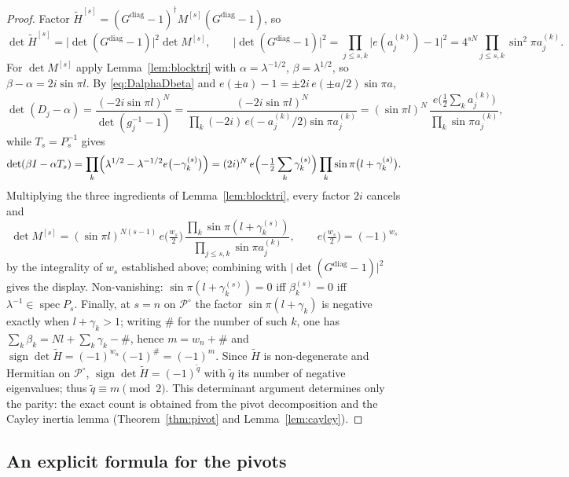 \documentclass[11pt]{article}
\theoremstyle{definition}
\newcommand{\Ht}{\widetilde H}
\begin{document}
\begin{proof}
Factor
$\Ht^{[s]}=(G^{\mathrm{diag}}-1)^{\dagger}M^{[s]}(G^{\mathrm{diag}}-1)$,
so
\[
\det\Ht^{[s]}=\bigl|\det(G^{\mathrm{diag}}-1)\bigr|^{2}\det M^{[s]},
\qquad
\bigl|\det(G^{\mathrm{diag}}-1)\bigr|^{2}
=\prod_{j\le s,k}\bigl|e(a_j^{(k)})-1\bigr|^{2}
=4^{sN}\prod_{j\le s,k}\sin^{2}\pi a_j^{(k)} .
\]
For $\det M^{[s]}$ apply Lemma~\ref{lem:blocktri} with
$\alpha=\lambda^{-1/2}$, $\beta=\lambda^{1/2}$, so
$\beta-\alpha=2i\sin\pi l$. By \eqref{eq:DalphaDbeta} and
$e(\pm a)-1=\pm2i\,e(\pm a/2)\sin\pi a$,
\[
\det(D_j-\alpha)
=\frac{(-2i\sin\pi l)^{N}}{\det(g_j^{-1}-1)}
=\frac{(-2i\sin\pi l)^{N}}
{\prod_k(-2i)\,e\bigl(-a_j^{(k)}/2\bigr)\sin\pi a_j^{(k)}}
=(\sin\pi l)^{N}\,
\frac{e\bigl(\tfrac12\sum_ka_j^{(k)}\bigr)}
{\prod_k\sin\pi a_j^{(k)}},
\]
while $T_s=P_s^{-1}$ gives
\[
\det(\beta I-\alpha T_s)
=\prod_k\Bigl(\lambda^{1/2}-\lambda^{-1/2}e\bigl(-\gamma^{(s)}_k
\bigr)\Bigr)
=(2i)^{N}\,e\Bigl(-\tfrac12\sum_k\gamma^{(s)}_k\Bigr)
\prod_k\sin\pi\bigl(l+\gamma^{(s)}_k\bigr).
\]
Multiplying the three ingredients of Lemma~\ref{lem:blocktri}, every
factor $2i$ cancels and
\[
\det M^{[s]}
=(\sin\pi l)^{N(s-1)}\,e\bigl(\tfrac{w_s}2\bigr)\,
\frac{\prod_k\sin\pi(l+\gamma^{(s)}_k)}
{\prod_{j\le s,k}\sin\pi a_j^{(k)}},
\qquad
e\bigl(\tfrac{w_s}2\bigr)=(-1)^{w_s}
\]
by the integrality of $w_s$ established above; combining with
$\bigl|\det(G^{\mathrm{diag}}-1)\bigr|^{2}$ gives the display.
Non-vanishing: $\sin\pi(l+\gamma^{(s)}_k)=0$ iff $\beta^{(s)}_k=0$
iff $\lambda^{-1}\in\operatorname{spec}P_s$. Finally, at $s=n$ on
$\mathcal P^{\circ}$ the factor $\sin\pi(l+\gamma_k)$ is negative
exactly when $l+\gamma_k>1$; writing $\#$ for the number of such $k$,
one has $\sum_k\beta_k=Nl+\sum_k\gamma_k-\#$, hence $m=w_n+\#$ and
$\operatorname{sign}\det\Ht=(-1)^{w_n}(-1)^{\#}=(-1)^{m}$. Since $\Ht$
is non-degenerate and Hermitian on $\mathcal P^{\circ}$,
$\operatorname{sign}\det\Ht=(-1)^{\widetilde q}$ with $\widetilde q$
its number of negative eigenvalues; thus $\widetilde q\equiv m\pmod2$.
This determinant argument determines only the parity: the exact count
is obtained from the pivot decomposition and the Cayley inertia lemma
(Theorem~\ref{thm:pivot} and Lemma~\ref{lem:cayley}).
\end{proof}

\subsection{An explicit formula for the pivots}
\end{document}
